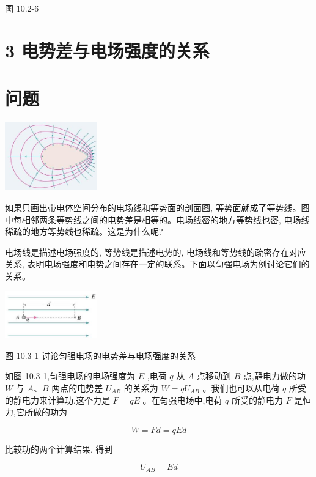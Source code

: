 \documentclass[10pt]{article}
\begin{document}
图 10.2-6

\section*{3 电势差与电场强度的关系}

\section*{问题}

\begin{center}
\includegraphics[max width=0.3\textwidth]{images/01911d5f-8e38-70c0-b5b8-2b399bd115b6_40_733519.jpg}
\end{center}

如果只画出带电体空间分布的电场线和等势面的剖面图, 等势面就成了等势线。图中每相邻两条等势线之间的电势差是相等的。电场线密的地方等势线也密, 电场线稀疏的地方等势线也稀疏。这是为什么呢?

电场线是描述电场强度的, 等势线是描述电势的, 电场线和等势线的疏密存在对应关系, 表明电场强度和电势之间存在一定的联系。下面以匀强电场为例讨论它们的关系。

\begin{center}
\includegraphics[max width=0.3\textwidth]{images/01911d5f-8e38-70c0-b5b8-2b399bd115b6_40_383540.jpg}
\end{center}

图 10.3-1 讨论匀强电场的电势差与电场强度的关系

如图 10.3-1,匀强电场的电场强度为 \(E\) ,电荷 \(q\) 从 \(A\) 点移动到 \(B\) 点,静电力做的功 \(W\) 与 \(A\text{、}B\) 两点的电势差 \({U}_{AB}\) 的关系为 \(W = q{U}_{AB}\) 。我们也可以从电荷 \(q\) 所受的静电力来计算功,这个力是 \(F = {qE}\) 。在匀强电场中,电荷 \(q\) 所受的静电力 \(F\) 是恒力,它所做的功为

\[
W = {Fd} = {qEd}
\]

比较功的两个计算结果, 得到

\[
{U}_{AB} = {Ed}
\]
\end{document}
